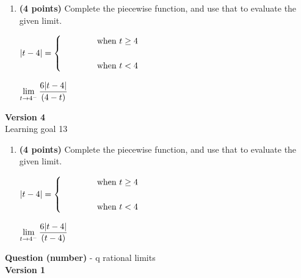 \documentclass[12pt]{amsart}
\begin{document}
\begin{enumerate}[resume]
\item {\bf (4 points)} 
 Complete the piecewise function, and use that to evaluate the given limit.

\vspace{.5cm}

$|t- \a| = \begin{cases} \hspace{1cm} & \text{ when } t \geq \a \\ & \\ \hspace{1cm} & \text{ when } t < \a \end{cases}$

\vspace{.5cm}

$\displaystyle \lim_{t \rightarrow \a^-} \frac{\ifthenelse{\ktop=1}{\k}{}\ifthenelse{\abstop=1}{|t-\a|}{(\a-t)}}{\ifthenelse{\ktop=0}{\k}{}\ifthenelse{\abstop=0}{|t-\a|}{(\a-t)}}$

\vfill 
 \end{enumerate}$ $ \\ {\bf Version 4} \\ 
Learning goal 13
\begin{enumerate}[resume]
\item {\bf (4 points)} 
 Complete the piecewise function, and use that to evaluate the given limit.

\vspace{.5cm}

$|t- \a| = \begin{cases} \hspace{1cm} & \text{ when } t \geq \a \\ & \\ \hspace{1cm} & \text{ when } t < \a \end{cases}$

\vspace{.5cm}

$\displaystyle \lim_{t \rightarrow \a^-} \frac{\ifthenelse{\ktop=1}{\k}{}\ifthenelse{\abstop=1}{|t-\a|}{(t-\a)}}{\ifthenelse{\ktop=0}{\k}{}\ifthenelse{\abstop=0}{|t-\a|}{(t-\a)}}$

\vfill 
 \end{enumerate}\newpage\def \a{4}\def \b{1}\def \k{6}\def \fancyp{x^{2}-5x^{}+4}\def \simplep{6x^{}-24}\def \fancyreduced{3}\def \niceanstop{\frac{1}{2}}\def \niceansbottom{2}{\Large{\bf Question (number)}} - q rational limits\\ $ $ \\ {\bf Version 1} \\ 
\end{document}
